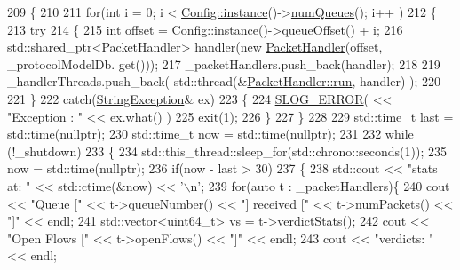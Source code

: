 \begin{DoxyCode}
209 \{
210 
211     \textcolor{keywordflow}{for}(\textcolor{keywordtype}{int} i = 0; i < \hyperlink{class_vsid_netfilter_1_1_config_abf1d4539011ef83cac0fef2ac864a3a9}{Config::instance}()->\hyperlink{class_vsid_netfilter_1_1_config_a911c8515f185b48bf4ad1cac8fa869d8}{numQueues}(); i++ )
212     \{
213         \textcolor{keywordflow}{try}
214         \{
215             \textcolor{keywordtype}{int} offset = \hyperlink{class_vsid_netfilter_1_1_config_abf1d4539011ef83cac0fef2ac864a3a9}{Config::instance}()->\hyperlink{class_vsid_netfilter_1_1_config_a9812d0584ac789366f5419acec1a6c77}{queueOffset}() + i;
216             std::shared\_ptr<PacketHandler> handler(\textcolor{keyword}{new} \hyperlink{class_vsid_netfilter_1_1_packet_handler}{PacketHandler}(offset, \_protocolModelDb.
      get()));
217             \_packetHandlers.push\_back(handler);
218 
219             \_handlerThreads.push\_back( std::thread(&\hyperlink{class_vsid_netfilter_1_1_packet_handler_a351a43a68f29a0f19a7baccebe1397e9}{PacketHandler::run}, handler) );
220 
221         \}
222         \textcolor{keywordflow}{catch}(\hyperlink{class_vsid_common_1_1_string_exception}{StringException}& ex)
223         \{
224             \hyperlink{_logger_8h_a2a8694cd392d18f4db6b9cc9f15bafe3}{SLOG\_ERROR}( << \textcolor{stringliteral}{"Exception : "} << ex.\hyperlink{class_vsid_common_1_1_string_exception_aee0da3bd4d08cb375d39defc77ae923c}{what}() )
225             exit(1);
226         \}
227     \}
228     
229     std::time\_t last = std::time(\textcolor{keyword}{nullptr});
230     std::time\_t now = std::time(\textcolor{keyword}{nullptr});
231 
232     \textcolor{keywordflow}{while} (!\_shutdown)
233     \{
234         std::this\_thread::sleep\_for(std::chrono::seconds(1));
235         now = std::time(\textcolor{keyword}{nullptr});
236         \textcolor{keywordflow}{if}(now - last > 30)
237         \{
238             std::cout << \textcolor{stringliteral}{"stats at: "} << std::ctime(&now) << \textcolor{charliteral}{'\(\backslash\)n'};
239             \textcolor{keywordflow}{for}(\textcolor{keyword}{auto} t : \_packetHandlers)\{
240                 cout << \textcolor{stringliteral}{"Queue ["} << t->queueNumber() << \textcolor{stringliteral}{"] received ["} << t->numPackets() << \textcolor{stringliteral}{"]"} << endl;
241                 std::vector<uint64\_t> vs = t->verdictStats();
242                 cout << \textcolor{stringliteral}{"Open Flows ["}  << t->openFlows() << \textcolor{stringliteral}{"]"} << endl;
243                 cout << \textcolor{stringliteral}{"verdicts: "} << endl;

\end{DoxyCode}
